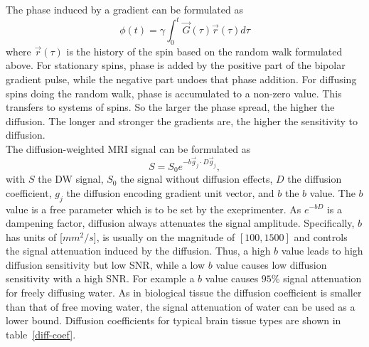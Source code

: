 The phase induced by a gradient can be formulated as
\[ \phi (t) = \gamma \int_0^t \overrightarrow{G}(\tau) \overrightarrow{r}(\tau) d \tau \]
where $\overrightarrow{r}(\tau)$ is the history of the spin based on the random walk formulated above.
For stationary spins, phase is added by the positive part of the bipolar gradient pulse, while the negative part undoes that phase addition.
For diffusing spins doing the random walk, phase is accumulated to a non-zero value.
This transfers to systems of spins.
So the larger the phase spread, the higher the diffusion.
The longer and stronger the gradients are, the higher the sensitivity to diffusion. \\

The diffusion-weighted MRI signal can be formulated as
\[ S = S_0 e^{-b \overrightarrow{g}_j \cdot D \overrightarrow{g}_j}, \]
with $S$ the DW signal, $S_0$ the signal without diffusion effects, $D$ the diffusion coefficient, $g_j$ the diffusion encoding gradient unit vector, and $b$ the $b$ value.
The $b$ value is a free parameter which is to be set by the exeprimenter.
As $e^{-bD}$ is a dampening factor, diffusion always attenuates the signal amplitude.
Specifically, $b$ has units of [$mm^2 / s$], is usually on the magnitude of $[100, 1500]$ and controls the signal attenuation induced by the diffusion.
Thus, a high $b$ value leads to high diffusion sensitivity but low SNR, while a low $b$ value causes low diffusion sensitivity with a high SNR.
For example a $b$ value causes $95\%$ signal attenuation for freely diffusing water.
As in biological tissue the diffusion coefficient is smaller than that of free moving water, the signal attenuation of water can be used as a lower bound.
Diffusion coefficients for typical brain tissue types are shown in table~\ref{diff-coef}.

\begin{table}[h]
 \noindent{}
 \caption{Diffusion coefficients for typical brain tissues~\autocite{sener_diffusion_2001, helenius_diffusion-weighted_2002}.}
 \label{diff-coef}
\end{table}

